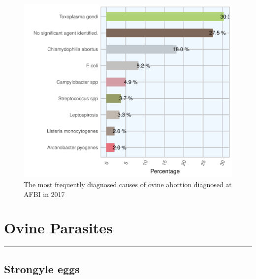 \documentclass[]{book}
\begin{document}
\begin{figure}

{\centering \includegraphics{AFBI_files/figure-latex/unnamed-chunk-111-1} 

}

\caption{The most frequently diagnosed causes of ovine abortion diagnosed at AFBI in 2017}\label{fig:unnamed-chunk-111}
\end{figure}

\chapter{Ovine Parasites}\label{ovine-parasites}

\begin{center}\rule{0.5\linewidth}{\linethickness}\end{center}

\section{Strongyle eggs}\label{strongyle-eggs}
\end{document}

